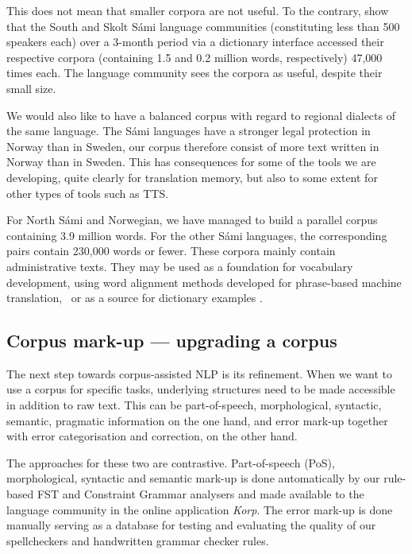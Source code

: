 \documentclass[free]{flammie}
\begin{document}
This does not mean that smaller corpora are not useful. To the contrary,
\cite{Antonsen2020samiske} show that the South and Skolt Sámi language
communities (constituting less than 500 speakers each) over a 3-month period via
a dictionary interface accessed their respective corpora (containing 1.5 and 0.2
million words, respectively) 47,000 times each. The language community sees the
corpora as useful, despite their small size.















We would also like to have a balanced corpus with regard to regional dialects of
the same language. The Sámi languages have a stronger legal protection in Norway
than in Sweden, our corpus therefore consist of more text written in Norway than
in Sweden. This has consequences for some of the tools we are developing, quite
clearly for translation memory, but also to some extent for other types of tools
such as TTS.\@




For North Sámi and Norwegian, we have managed to build a parallel corpus
containing 3.9 million words. For the other Sámi languages, the corresponding
pairs contain 230,000 words or fewer. These corpora mainly contain
administrative texts. They may be used as a foundation for vocabulary
development, using word alignment methods developed for phrase-based machine
translation,~\cite{Gerstenberger2013digging} or as a source for dictionary
examples {\cite{Antonsen2020samiske}}.






\subsection{Corpus mark-up --- upgrading a corpus}

The next step towards corpus-assisted NLP is its refinement.  When we want to
use a corpus for specific tasks, underlying structures need to be made
accessible in addition to raw text. This can be part-of-speech, morphological,
syntactic, semantic, pragmatic information on the one hand, and error mark-up
together with error categorisation and correction, on the other hand.

The approaches for these two are contrastive. Part-of-speech (PoS),
morphological, syntactic and semantic mark-up is done automatically by our
rule-based FST and Constraint Grammar analysers and made available to the
language community in the online application \textit{Korp}.  The error mark-up
is done manually serving as a database for testing and evaluating the quality of
our spellcheckers and handwritten grammar checker rules.
\end{document}
